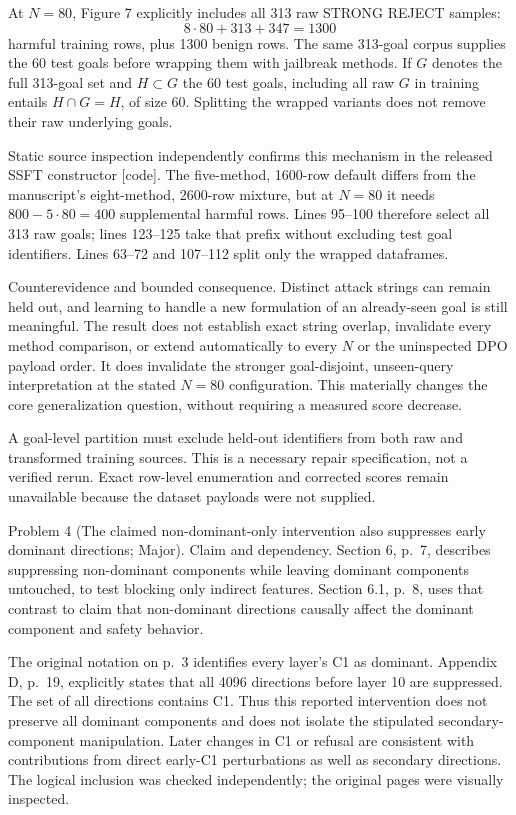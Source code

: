 \documentclass[10pt]{article}
\begin{document}
At \(N=80\), Figure 7 explicitly includes all 313 raw STRONG REJECT samples: \[8\cdot80+313+347=1300\] harmful training rows, plus 1300 benign rows. The same 313-goal corpus supplies the 60 test goals before wrapping them with jailbreak methods. If \(G\) denotes the full 313-goal set and \(H\subset G\) the 60 test goals, including all raw \(G\) in training entails \(H\cap G=H\), of size 60. Splitting the wrapped variants does not remove their raw underlying goals.\par
Static source inspection independently confirms this mechanism in the released SSFT constructor [code]. The five-method, 1600-row default differs from the manuscript’s eight-method, 2600-row mixture, but at \(N=80\) it needs \(800-5\cdot80=400\) supplemental harmful rows. Lines 95–100 therefore select all 313 raw goals; lines 123–125 take that prefix without excluding test goal identifiers. Lines 63–72 and 107–112 split only the wrapped dataframes.\par
Counterevidence and bounded consequence. Distinct attack strings can remain held out, and learning to handle a new formulation of an already-seen goal is still meaningful. The result does not establish exact string overlap, invalidate every method comparison, or extend automatically to every \(N\) or the uninspected DPO payload order. It does invalidate the stronger goal-disjoint, unseen-query interpretation at the stated \(N=80\) configuration. This materially changes the core generalization question, without requiring a measured score decrease.\par
A goal-level partition must exclude held-out identifiers from both raw and transformed training sources. This is a necessary repair specification, not a verified rerun. Exact row-level enumeration and corrected scores remain unavailable because the dataset payloads were not supplied.\par
Problem 4 (The claimed non-dominant-only intervention also suppresses early dominant directions; Major).  Claim and dependency. Section 6, p. 7, describes suppressing non-dominant components while leaving dominant components untouched, to test blocking only indirect features. Section 6.1, p. 8, uses that contrast to claim that non-dominant directions causally affect the dominant component and safety behavior.\par
The original notation on p. 3 identifies every layer’s C1 as dominant. Appendix D, p. 19, explicitly states that all 4096 directions before layer 10 are suppressed. The set of all directions contains C1. Thus this reported intervention does not preserve all dominant components and does not isolate the stipulated secondary-component manipulation. Later changes in C1 or refusal are consistent with contributions from direct early-C1 perturbations as well as secondary directions. The logical inclusion was checked independently; the original pages were visually inspected.\par
\end{document}
